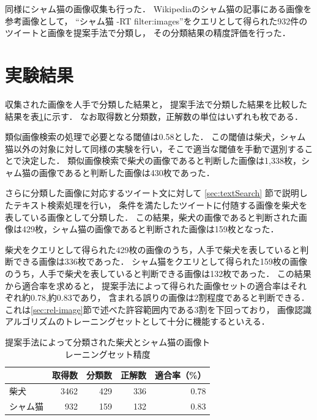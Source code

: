 \documentclass{deimj}
\begin{document}
同様にシャム猫の画像収集も行った．
Wikipediaのシャム猫の記事にある画像を参考画像として，
“シャム猫 -RT filter:images”をクエリとして得られた932件のツイートと画像を提案手法で分類し，
その分類結果の精度評価を行った．

\section{実験結果}
\label{sec:expresult}

収集された画像を人手で分類した結果と，
提案手法で分類した結果を比較した
結果を表\ref{tab:result-shiba}に示す．
なお取得数と分類数，正解数の単位はいずれも枚である．

類似画像検索の処理で必要となる閾値は0.58とした．
この閾値は柴犬，シャム猫以外の対象に対して同様の実験を行い，そこで適当な閾値を手動で選別することで決定した．
類似画像検索で柴犬の画像であると判断した画像は1,338枚，シャム猫の画像であると判断した画像は430枚であった．

さらに分類した画像に対応するツイート文に対して
\ref{sec:textSearch}
節で説明したテキスト検索処理を行い，
条件を満たしたツイートに付随する画像を柴犬を表している画像として分類した．
この結果，柴犬の画像であると判断された画像は429枚，シャム猫の画像であると判断された画像は159枚となった．


柴犬をクエリとして得られた429枚の画像のうち，人手で柴犬を表していると判断できる画像は336枚であった．
シャム猫をクエリとして得られた159枚の画像のうち，人手で柴犬を表していると判断できる画像は132枚であった．
この結果から適合率を求めると，
提案手法によって得られた画像セットの適合率はそれぞれ約0.78,約0.83であり，
含まれる誤りの画像は2割程度であると判断できる．
これは\ref{sec:rel-image}節で述べた許容範囲内である3割を下回っており，
画像認識アルゴリズムのトレーニングセットとして十分に機能するといえる．

\begin{table}[tb]
\begin{center}
\caption{提案手法によって分類された柴犬とシャム猫の画像トレーニングセット精度}
\label{tab:result-shiba}
\begin{tabular}{|l|r|r|r|r|}\hline
& 取得数& 分類数& 正解数& 適合率（\%） \\ \hline \hline

柴犬& 3462& 429& 336& 0.78 \\ \hline
シャム猫& 932& 159& 132& 0.83 \\ \hline
\end{tabular}
\end{center}
\end{table}
\end{document}

